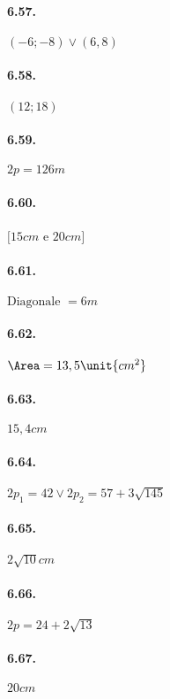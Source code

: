 \begin{multicols}{2}
\paragraph{6.57.} \((-6;-8)\vee (6,8)\)

\paragraph{6.58.} \((12;18)\)

\paragraph{6.59.} \(2p=126\unit{m}\)

\paragraph{6.60.} \([15\unit{cm}\) e \(20\unit{cm}]\)

\paragraph{6.61.} \(\text{Diagonale }=6\unit{m}\)

\paragraph{6.62.} \(\Area=13,5\unit{{cm}^2}\)

\paragraph{6.63.} \(15,4\unit{cm}\)

\paragraph{6.64.} \(2p_1=42\vee 2p_2=57+3\sqrt{145}\)

\paragraph{6.65.} \(2\sqrt{10}\unit{cm}\)

\paragraph{6.66.} \(2p=24+2\sqrt{13}\)

\paragraph{6.67.} \(20\unit{cm}\)


\end{multicols}
